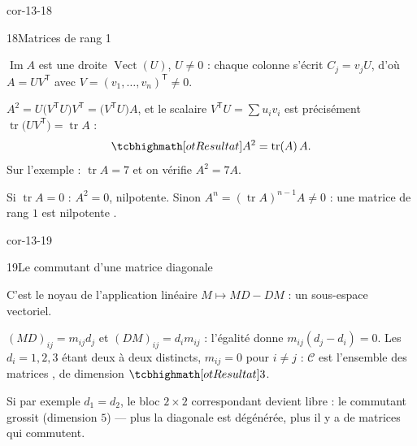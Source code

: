 \begin{blocLivre}{cor-13-18}
\begin{corrige}{18}{Matrices de rang 1}
\begin{questions}
  \item $\operatorname{Im}A$ est une droite $\operatorname{Vect}(U)$,
    $U\neq0$ : chaque colonne s'écrit $C_j=v_jU$, d'où
    $A=UV^{\mathsf T}$ avec $V=(v_1,\dots,v_n)^{\mathsf T}\neq0$.
  \item $A^{2}=U\bigl(V^{\mathsf T}U\bigr)V^{\mathsf T}
    =\bigl(V^{\mathsf T}U\bigr)A$, et le scalaire
    $V^{\mathsf T}U=\sum u_iv_i$ est précisément
    $\operatorname{tr}\bigl(UV^{\mathsf T}\bigr)=\operatorname{tr}A$ :
    \[
    \res{A^{2}=\operatorname{tr}(A)\,A}.
    \]
    Sur l'exemple : $\operatorname{tr}A=7$ et on vérifie $A^{2}=7A$.
  \item Si $\operatorname{tr}A=0$ : $A^{2}=0$, nilpotente. Sinon
    $A^{n}=(\operatorname{tr}A)^{n-1}A\neq0$ : une matrice de rang $1$ est
    nilpotente .
\end{questions}
\end{corrige}
\end{blocLivre}

\begin{blocLivre}{cor-13-19}
\begin{corrige}{19}{Le commutant d'une matrice diagonale}
\begin{questions}
  \item C'est le noyau de l'application linéaire $M\mapsto MD-DM$ : un
    sous-espace vectoriel.
  \item $(MD)_{ij}=m_{ij}d_j$ et $(DM)_{ij}=d_im_{ij}$ : l'égalité donne
    $m_{ij}(d_j-d_i)=0$. Les $d_i=1,2,3$ étant deux à deux distincts,
    $m_{ij}=0$ pour $i\neq j$ : $\mathcal{C}$ est l'ensemble des matrices
    , de dimension $\res{3}$.
  \item Si par exemple $d_1=d_2$, le bloc $2\times2$ correspondant devient
    libre : le commutant grossit (dimension $5$) — plus la diagonale est
    dégénérée, plus il y a de matrices qui commutent.
\end{questions}
\end{corrige}
\end{blocLivre}

